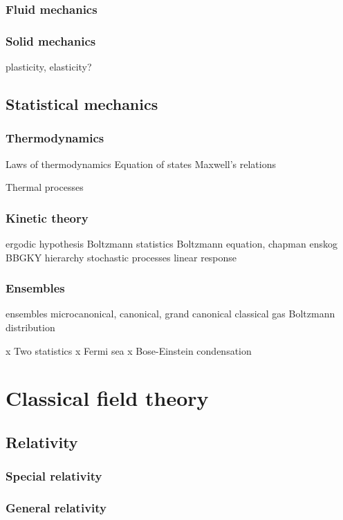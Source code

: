 \documentclass{../../large}
\begin{document}
\section{Fluid mechanics}
\section{Solid mechanics}
plasticity, elasticity?


\chapter{Statistical mechanics}

\section{Thermodynamics}
Laws of thermodynamics
Equation of states
Maxwell's relations

Thermal processes


\section{Kinetic theory}
ergodic hypothesis
Boltzmann statistics
Boltzmann equation, chapman enskog
BBGKY hierarchy
stochastic processes
linear response

\section{Ensembles}
ensembles
microcanonical, canonical, grand canonical
classical gas
Boltzmann distribution

x Two statistics
x Fermi sea
x Bose-Einstein condensation





\part{Classical field theory}

\chapter{Relativity}
\section{Special relativity}
\section{General relativity}
\end{document}
